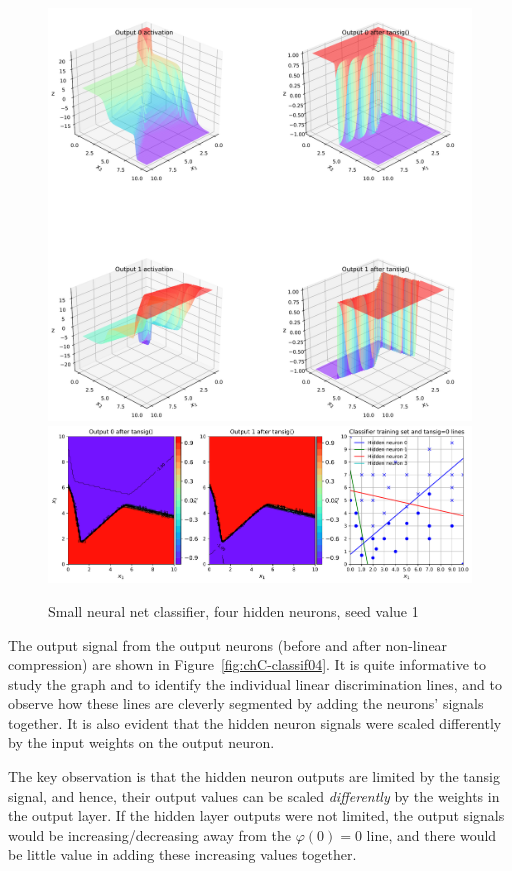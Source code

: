   
\begin{figure}[p]
\centering
\includegraphics[width=\textwidth]{pic/chC-classifa05}
\includegraphics[width=\textwidth]{pic/chC-classifb05}
\caption{Small neural net classifier, four hidden neurons, seed value 1}
\label{fig:chC-classif05}
\end{figure}

The output signal from the output neurons (before and after non-linear compression) are shown in Figure~\ref{fig:chC-classif04}.   It is quite informative to study the graph and to identify the individual linear discrimination lines, and to observe how these lines are cleverly segmented by adding the neurons' signals together.   It is also evident that the hidden neuron signals  were scaled differently by the input weights on the output neuron.  

The key observation is that the hidden neuron outputs are limited by the tansig signal, and hence, their output values can be scaled \textit{differently} by the weights in the output layer.  If the hidden layer outputs were not limited, the output signals would be  increasing/decreasing away from the $\varphi(0)=0$  line, and there would be little value in adding these increasing values together. 

